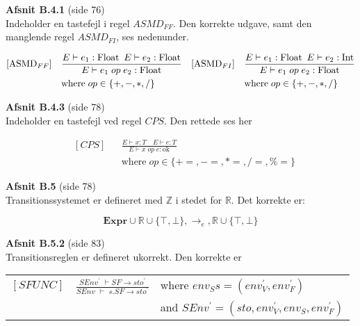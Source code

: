 \documentclass[a4paper,11pt,twoside]{report}
\begin{document}
\noindent \textbf{Afsnit B.4.1} (side 76)\\
\noindent Indeholder en tastefejl i regel $ASMD_{FF}$. Den korrekte udgave, samt den manglende regel $ASMD_{FI}$, ses nedenunder.

\begin{align*}
&[\text{ASMD}_{FF}]           &  &\frac{E \vdash e_1 : \text{Float} \enskip E \vdash e_2 : \text{Float}}{E \vdash e_1\; op \;e_2 : \text{Float}} & &[\text{ASMD}_{FI}]           &  &\frac{E \vdash e_1 : \text{Float} \enskip E \vdash e_2 : \text{Int}}{E \vdash e_1\; op \;e_2 : \text{Float}}\\    
& & &\text{where}\; op \in \{+, -, *, /\} & & & &\text{where}\; op \in \{+, -, *, /\}
\end{align*}

\noindent \textbf{Afsnit B.4.3} (side 78)\\
\noindent Indeholder en tastefejl ved regel $CPS$. Den rettede ses her

\begin{align*}
&[CPS] & &\frac{E \vdash x : T\quad E \vdash e : T}{E \vdash x\; op\; e : \text{ok}}\\
& & &\text{where}\; op \in \{+=, -=, *=, /=, \%=\}
\end{align*}

\noindent \textbf{Afsnit B.5} (side 78)\\
\noindent Transitionssystemet er defineret med $\mathds{Z}$ i stedet for $\mathds{R}$. Det korrekte er: 

$$ \textbf{Expr} \cup \mathds{R} \cup \{\top, \bot\}, \rightarrow_e, \mathds{R} \cup \{\top, \bot\} $$

\noindent \textbf{Afsnit B.5.2} (side 83)\\
\noindent Transitionsreglen er defineret ukorrekt. Den korrekte er

\begin{table}[H]
\centering
\begin{tabular}{lll}
$[SFUNC]$ & $\frac{SEnv^\prime\; \vdash SF \rightarrow sto^\prime}{SEnv\; \vdash\; s.SF \rightarrow sto^\prime}$ & where $env_S s = (env_V^\prime, env_F^\prime)$\\
& & and $SEnv^\prime = (sto, env_V^\prime, env_S, env_F^\prime)$
\end{tabular}
\end{table}
\end{document}
